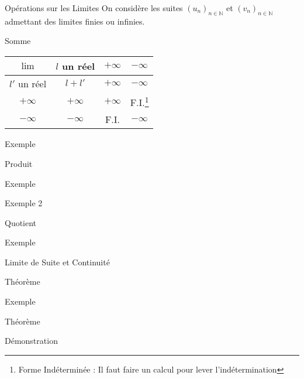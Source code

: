 \documentclass{cours}
\begin{document}
    \begin{Gpartie}{Opérations sur les Limites} 
        On considère les suites $(u_n)_{n\in\mathbb{N}}$ et $(v_n)_{n\in\mathbb{N}}$ admettant des limites finies ou infinies.
        \begin{Spartie}{Somme}
            \begin{center}\begin{tabular}[c]{ |c||c|c|c| } \hline
                $\lim$          & $l$ un réel   & $+\infty$ & $-\infty$ \\ \hline \hline
                $l'$ un réel    & $l+l'$        & $+\infty$ & $-\infty$ \\ \hline
                $+\infty$       & $+\infty$     & $+\infty$ & F.I.\footnote[1]{Forme Indéterminée : Il faut faire un calcul pour lever l'indétermination} \\ \hline
                $-\infty$       & $-\infty$     & F.I.\footnotemark[1] & $-\infty$ \\ \hline
            \end{tabular}\end{center}
            \parbox{\linewidth}{}
            \begin{SSpartie}{Exemple} 
                
            \end{SSpartie}
        \end{Spartie}
        \begin{Spartie}{Produit} 
            \begin{SSpartie}{Exemple} 
                
            \end{SSpartie}
            \begin{SSpartie}{Exemple 2} 

            \end{SSpartie}
        \end{Spartie}
        \begin{Spartie}{Quotient} 
            \begin{SSpartie}{Exemple} 
                
            \end{SSpartie}
        \end{Spartie}
    \end{Gpartie}
    \begin{Gpartie}{Limite de Suite et Continuité} 
        \begin{Spartie}{Théorème} 
            
            \begin{SSpartie}{Exemple} 
                
            \end{SSpartie}
        \end{Spartie}
        \begin{Spartie}{Théorème} 
            \begin{SSpartie}{Démonstration} 
                
            \end{SSpartie}
        \end{Spartie}
    \end{Gpartie}
\end{document}
